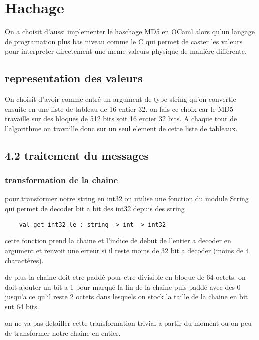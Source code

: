 
\section{Hachage}

    On a choisit d'aussi implementer le haschage MD5 en OCaml alors qu'un langage de programation plus bas niveau comme le C qui permet de caster les valeurs pour interpreter directement une meme valeurs physique de manière differente. 

    \subsection {representation des valeurs}

    On choisit d'avoir comme entré un argument de type string qu'on convertie ensuite en une liste de tableau de 16 entier 32. 
    on fais ce choix car le MD5 travaille sur des bloques de 512 bits soit 16 entier 32 bits. A chaque tour de l'algorithme on travaille donc sur un seul element de cette liste de tableaux.

    \subsection{4.2 traitement du messages} 
    \subsubsection{transformation de la chaine }
    
    pour transformer notre string en int32 on utilise une fonction du module String qui permet de decoder bit a bit des int32 depuis des string 
    
\begin{lstlisting}
    val get_int32_le : string -> int -> int32
\end{lstlisting}  

    cette fonction prend la chaine et l'indice de debut de l'entier a decoder en argument et renvoit une erreur si il reste moins de 32 bit a decoder (moins de 4 charactères).

    de plus la chaine doit etre paddé pour etre divisible en bloque de 64 octets. 
    on doit ajouter un bit a 1 pour marqué la fin de la chaine puis paddé avec des 0 jusqu'a ce qu'il reste 2 octets dans lesquels on stock la taille de la chaine en bit sut 64 bits. 

    
    on ne va pas detailler cette transformation trivial a partir du moment ou on peu de transformer notre chaine en entier.


